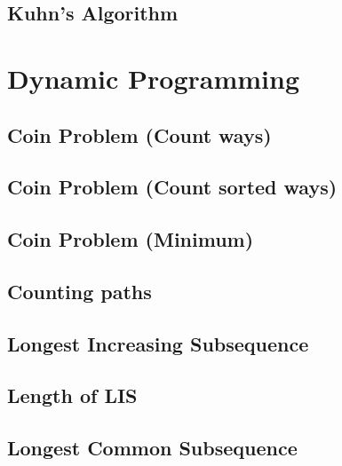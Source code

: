 \documentclass[10pt]{article}
\begin{document}
\begin{multicols*}{2}
\subsection{Kuhn's Algorithm}


\section{Dynamic Programming}

\subsection{Coin Problem (Count ways)}


\subsection{Coin Problem (Count sorted ways)}


\subsection{Coin Problem (Minimum)}


\subsection{Counting paths}


\subsection{Longest Increasing Subsequence}


\subsection{Length of LIS}


\subsection{Longest Common Subsequence}



\end{multicols*}
\end{document}
